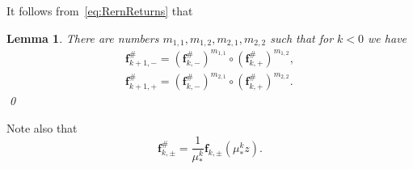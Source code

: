 \documentclass[]{amsart}
\newcommand{\bbf}{{\mathbf f}}
\newtheorem{lem}[thm]{Lemma}
\theoremstyle{remark}
\numberwithin{equation}{section}
\theoremstyle{definition}
\begin{document}
It follows from~\eqref{eq:RernReturns} that 
\begin{lem}
\label{lem:F_0 is iter of F_n}
There are numbers $m_{1,1}, m_{1,2},m_{2,1},m_{2,2}$ such that for $k< 0$ we have
\begin{align*}
\bbf^{\#}_{k+1,-} =  (\bbf^{\#}_{k,-})^{m_{1,1}}\circ  (\bbf^{\#}_{k,+})^{m_{1,2}},\\ 
\bbf^{\#}_{k+1,+} = (\bbf^{\#}_{k,-})^{m_{2,1}}\circ  (\bbf^{\#}_{k,+})^{m_{2,2}}.
\end{align*}
 \qed
\end{lem}

Note also that
\begin{equation}
\label{eq:defn:f hash}
\bbf^{\#}_{k,\pm} = \frac {1}{\mu_*^{k}}\bbf_{k,\pm}\left(\mu_*^{k} z \right).
\end{equation}
\end{document}
